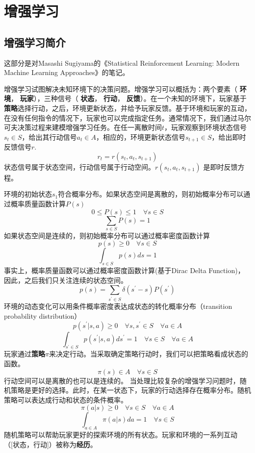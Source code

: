 \part{增强学习}
\chapter{增强学习简介} \label{chap:introduction}


这部分是对Masashi Sugiyama的《Statistical Reinforcement Learning: Modern Machine Learning Approaches》的笔记。


增强学习试图解决未知环境下的决策问题。增强学习可以概括为：两个要素（ \textbf{环境}， \textbf{玩家}），三种信号（ \textbf{状态}， \textbf{行动}， \textbf{反馈}）。在一个未知的环境下，玩家基于\textbf{策略}选择行动，之后，环境更新状态，并给予玩家反馈。基于环境和玩家的互动，在没有任何指令的情况下，玩家也可以完成指定任务。通常情况下，我们通过马尔可夫决策过程来建模增强学习任务。在任一离散时间$t$，玩家观察到环境状态信号$s_t \in S$，给出其行动信号$a_t \in A$，相应的，环境更新状态信号$s_{t+1} \in S$，给出即时反馈信号$r$.
$$r_t = r(s_t,a_t,s_{t+1})$$
状态信号属于状态空间，行动信号属于行动空间。$r(s_t,a_t,s_{t+1})$ 是即时反馈方程。

环境的初始状态$s_1$符合概率分布。如果状态空间是离散的，则初始概率分布可以通过概率质量函数计算$P(s)$
$$0 \leq P(s) \leq 1 \quad  \forall s \in S $$
$$\sum_{s \in S } P(s) = 1$$
如果状态空间是连续的，则初始概率分布可以通过概率密度函数计算
$$ p(s) \geq 0 \quad  \forall s \in S $$
$$\int_{s \in S} p(s) ds = 1 $$
事实上，概率质量函数可以通过概率密度函数计算(基于Dirac Delta Function)，因此，之后我们只关注连续的状态空间。
$$p(s) = \sum_{s^\prime \in S} \delta(s^\prime - s)P(s^\prime)$$
环境的动态变化可以用条件概率密度表达成状态的转化概率分布（transition probability distribution）
$$p(s^\prime|s,a) \geq 0 \quad  \forall s,s^\prime \in S \quad  \forall a \in A $$
$$\int_{s^\prime \in S} p(s^\prime|s,a) ds^\prime = 1  \quad  \forall s \in S \quad  \forall a \in A $$
玩家通过\textbf{策略}$\pi$来决定行动。当采取确定策略行动时，我们可以把策略看成状态的函数。
$$\pi(s) \in A \quad  \forall s \in S $$
行动空间可以是离散的也可以是连续的。
当处理比较复杂的增强学习问题时，随机策略是更好的选择。此时，在某一状态下，玩家的行动选择存在概率分布。随机策略可以表达成行动和状态的条件概率。
$$\pi(a|s) \geq 0 \quad  \forall s \in S \quad  \forall a \in A $$
$$\int_{a \in A} \pi(a|s) da  = 1  \quad  \forall s \in S $$
随机策略可以帮助玩家更好的探索环境的所有状态。玩家和环境的一系列互动（[状态，行动]）被称为\textbf{经历}。

